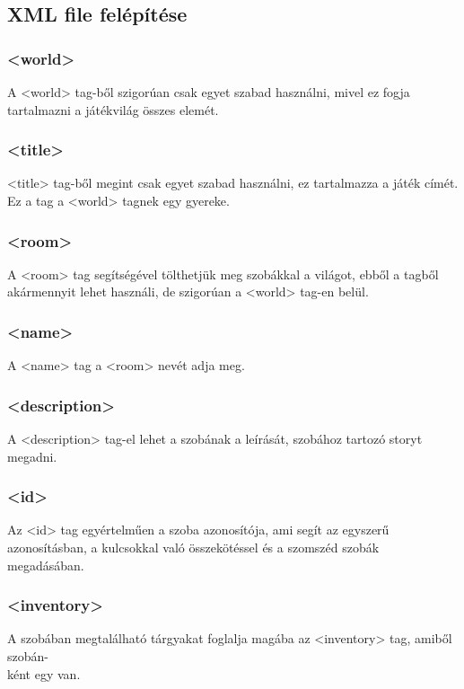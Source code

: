 \documentclass{scrarticle}
\begin{document}
\subsection{XML file felépítése}

\subsubsection{<world>}
A <world> tag-ből szigorúan csak egyet szabad használni, mivel ez fogja tartalmazni a játékvilág összes elemét.

\subsubsection{<title>}
<title> tag-ből megint csak egyet szabad használni, ez tartalmazza a játék címét. Ez a tag a <world> tagnek egy gyereke.

\subsubsection{<room>}
A <room> tag segítségével tölthetjük meg szobákkal a világot, ebből a tagből akármennyit lehet használi, de szigorúan a <world> tag-en belül.

\subsubsection{<name>}
A <name> tag a <room> nevét adja meg.

\subsubsection{<description>}
A <description> tag-el lehet a szobának a leírását, szobához tartozó storyt megadni.

\subsubsection{<id>}
Az <id> tag egyértelműen a szoba azonosítója, ami segít az egyszerű azonosításban, a kulcsokkal való összekötéssel és a szomszéd szobák megadásában.

\subsubsection{<inventory>}
A szobában megtalálható tárgyakat foglalja magába az <inventory> tag, amiből szobán-\\ként egy van.
\end{document}

